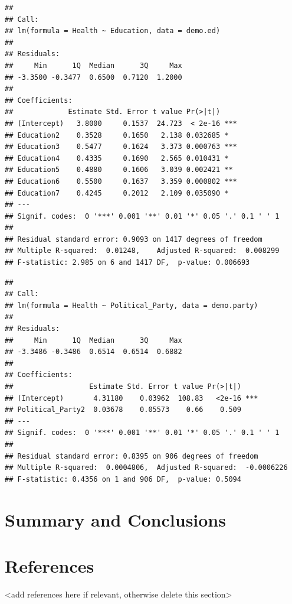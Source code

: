 \documentclass[
  12pt,
]{article}
\begin{document}
\begin{verbatim}
## 
## Call:
## lm(formula = Health ~ Education, data = demo.ed)
## 
## Residuals:
##     Min      1Q  Median      3Q     Max 
## -3.3500 -0.3477  0.6500  0.7120  1.2000 
## 
## Coefficients:
##             Estimate Std. Error t value Pr(>|t|)    
## (Intercept)   3.8000     0.1537  24.723  < 2e-16 ***
## Education2    0.3528     0.1650   2.138 0.032685 *  
## Education3    0.5477     0.1624   3.373 0.000763 ***
## Education4    0.4335     0.1690   2.565 0.010431 *  
## Education5    0.4880     0.1606   3.039 0.002421 ** 
## Education6    0.5500     0.1637   3.359 0.000802 ***
## Education7    0.4245     0.2012   2.109 0.035090 *  
## ---
## Signif. codes:  0 '***' 0.001 '**' 0.01 '*' 0.05 '.' 0.1 ' ' 1
## 
## Residual standard error: 0.9093 on 1417 degrees of freedom
## Multiple R-squared:  0.01248,    Adjusted R-squared:  0.008299 
## F-statistic: 2.985 on 6 and 1417 DF,  p-value: 0.006693
\end{verbatim}

\begin{verbatim}
## 
## Call:
## lm(formula = Health ~ Political_Party, data = demo.party)
## 
## Residuals:
##     Min      1Q  Median      3Q     Max 
## -3.3486 -0.3486  0.6514  0.6514  0.6882 
## 
## Coefficients:
##                  Estimate Std. Error t value Pr(>|t|)    
## (Intercept)       4.31180    0.03962  108.83   <2e-16 ***
## Political_Party2  0.03678    0.05573    0.66    0.509    
## ---
## Signif. codes:  0 '***' 0.001 '**' 0.01 '*' 0.05 '.' 0.1 ' ' 1
## 
## Residual standard error: 0.8395 on 906 degrees of freedom
## Multiple R-squared:  0.0004806,  Adjusted R-squared:  -0.0006226 
## F-statistic: 0.4356 on 1 and 906 DF,  p-value: 0.5094
\end{verbatim}

\newpage

\hypertarget{summary-and-conclusions}{%
\section{Summary and Conclusions}\label{summary-and-conclusions}}

\newpage

\hypertarget{references}{%
\section{References}\label{references}}

\textless add references here if relevant, otherwise delete this
section\textgreater{}
\end{document}
